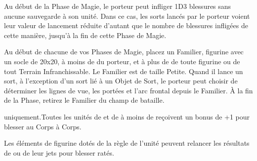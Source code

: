 {{{{{{{{\endpricelist

\armyarcaneitems

\startpricelist

Au début de la Phase de Magie, le porteur peut infliger 1D3 blessures sans aucune sauvegarde à son unité. Dans ce cas, les sorts lancés par le porteur voient leur valeur de lancement réduite d'autant que le nombre de blessures infligées de cette manière, jusqu'à la fin de cette Phase de Magie.

Au début de chacune de vos Phases de Magie, placez un Familier, figurine avec un socle de \unit{20x20}{\milli\meter}, à moins de  du porteur, et à plus de  de toute figurine ou de tout Terrain Infranchissable. Le Familier est de taille Petite. Quand il lance un sort, à l'exception d'un sort lié à un Objet de Sort, le porteur peut choisir de déterminer les lignes de vue, les portées et l'arc frontal depuis le Familier. À la fin de la Phase, retirez le Familier du champ de bataille.

\endpricelist

\armymagicalbanners

\startpricelist

\fleetcommander{} uniquement.\newline Toutes les unités de \corsairs{} et de \dreadlegionnaires{} à moins de  reçoivent un bonus de +1 pour blesser au Corps à Corps.

Les éléments de figurine dotés de la règle \killerinstinct{} de l'unité peuvent relancer les résultats de  ou  de leur jets pour blesser ratés.

\endpricelist

\closearmymagicalitems








\quickrefsheettitle


\bigskip
\begin{center}
\medskip


\end{center}}}}}}}}}
